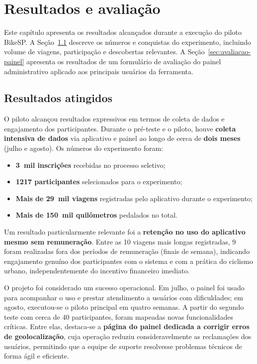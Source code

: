 
\chapter{Resultados e avaliação}
\label{cap:resultados}

Este capítulo apresenta os resultados alcançados durante a execução do piloto BikeSP. A Seção~\ref{sec:resultados-atingidos} descreve os números e conquistas do experimento, incluindo volume de viagens, participação e descobertas relevantes. A Seção~\ref{sec:avaliacao-painel} apresenta os resultados de um formulário de avaliação do painel administrativo aplicado aos principais usuários da ferramenta.

\section{Resultados atingidos}
\label{sec:resultados-atingidos}
O piloto alcançou resultados expressivos em termos de coleta de dados e
engajamento dos participantes. Durante o pré-teste e o piloto, houve
\textbf{coleta intensiva de dados} via aplicativo e painel ao longo de cerca de
\textbf{dois meses} (julho e agosto). Os números do experimento foram:
\begin{itemize}
  \item \textbf{3~mil inscrições} recebidas no processo seletivo;
  \item \textbf{1217 participantes} selecionados para o experimento;
  \item \textbf{Mais de 29~mil viagens} registradas pelo aplicativo durante o
        experimento;
  \item \textbf{Mais de 150~mil quilômetros} pedalados no total.
\end{itemize}

Um resultado particularmente relevante foi a \textbf{retenção no uso do
aplicativo mesmo sem remuneração}. Entre as 10 viagens mais longas registradas,
9 foram realizadas fora dos períodos de remuneração (finais de semana),
indicando engajamento genuíno dos participantes com o sistema e com a prática do
ciclismo urbano, independentemente do incentivo financeiro imediato.

O projeto foi considerado um sucesso operacional. Em julho, o painel foi usado
para acompanhar o uso e prestar atendimento a usuários com dificuldades; em
agosto, executou-se o piloto principal em quatro semanas. A partir do segundo
teste com cerca de 40 participantes, foram mapeadas novas funcionalidades
críticas. Entre elas, destaca-se a \textbf{página do painel dedicada a corrigir
erros de geolocalização}, cuja operação reduziu consideravelmente as reclamações
dos usuários, permitindo que a equipe de suporte resolvesse problemas técnicos
de forma ágil e eficiente.

